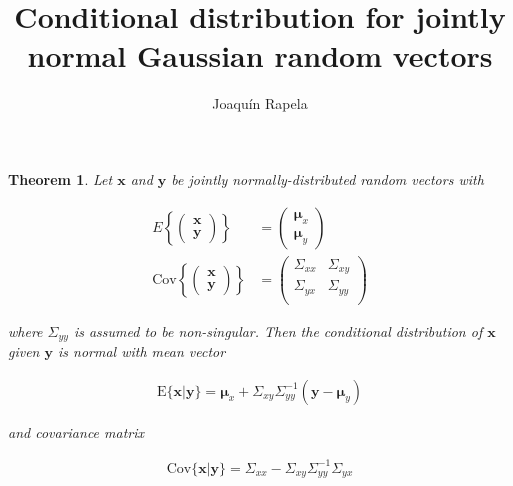 \documentclass[12pt]{article}
\title{Conditional distribution for jointly normal Gaussian random vectors}
\author{Joaquín Rapela}
\newtheorem{theorem}{Theorem}
\begin{document}
\maketitle

\begin{theorem}

    Let $\mathbf{x}$ and $\mathbf{y}$ be jointly normally-distributed random
    vectors with

    \begin{align*}
        E\left\{\left(\begin{array}{c}
                          \mathbf{x}\\
                          \mathbf{y}
                      \end{array}\right)\right\}&=\left(\begin{array}{c}
                                                           \boldsymbol{\mu}_x\\
                                                           \boldsymbol{\mu}_y
                                                       \end{array}\right)\\
        \text{Cov}\left\{\left(\begin{array}{c}
                                   \mathbf{x}\\
                                   \mathbf{y}
                               \end{array}\right)\right\}&=\left(\begin{array}{cc}
                                                                     \Sigma_{xx} & \Sigma_{xy} \\
                                                                     \Sigma_{yx} & \Sigma_{yy} \\
                                                                  \end{array}\right)
    \end{align*}

    \noindent where $\Sigma_{yy}$ is assumed to be non-singular.
    Then the conditional distribution of $\mathbf{x}$ given $\mathbf{y}$ is
    normal with mean vector

    \begin{align*}
        \text{E}\{\mathbf{x}|\mathbf{y}\}=\boldsymbol{\mu}_x+\Sigma_{xy}\Sigma_{yy}^{-1}(\mathbf{y}-\boldsymbol{\mu}_y)
    \end{align*}

    \noindent and covariance matrix

    \begin{align*}
        \text{Cov}\{\mathbf{x}|\mathbf{y}\}=\Sigma_{xx}-\Sigma_{xy}\Sigma_{yy}^{-1}\Sigma_{yx}
    \end{align*}
\end{theorem}
\end{document}
